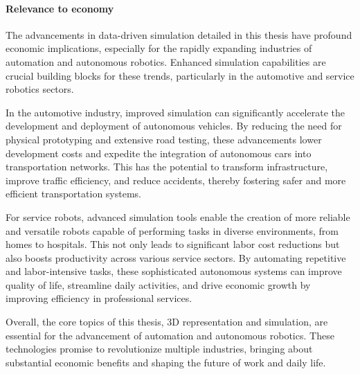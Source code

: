 \paragraph{Relevance to economy}
The advancements in data-driven simulation detailed in this thesis have profound economic implications, especially for the rapidly expanding industries of automation and autonomous robotics. Enhanced simulation capabilities are crucial building blocks for these trends, particularly in the automotive and service robotics sectors.

In the automotive industry, improved simulation can significantly accelerate the development and deployment of autonomous vehicles. By reducing the need for physical prototyping and extensive road testing, these advancements lower development costs and expedite the integration of autonomous cars into transportation networks. This has the potential to transform infrastructure, improve traffic efficiency, and reduce accidents, thereby fostering safer and more efficient transportation systems.

For service robots, advanced simulation tools enable the creation of more reliable and versatile robots capable of performing tasks in diverse environments, from homes to hospitals. This not only leads to significant labor cost reductions but also boosts productivity across various service sectors. By automating repetitive and labor-intensive tasks, these sophisticated autonomous systems can improve quality of life, streamline daily activities, and drive economic growth by improving efficiency in professional services.

Overall, the core topics of this thesis, 3D representation and simulation, are essential for the advancement of automation and autonomous robotics. These technologies promise to revolutionize multiple industries, bringing about substantial economic benefits and shaping the future of work and daily life.